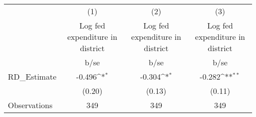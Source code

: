 {
\def\sym#1{\ifmmode^{#1}\else\(^{#1}\)\fi}
\begin{tabular}{l*{3}{c}}
\hline\hline
                    &\multicolumn{1}{c}{(1)}&\multicolumn{1}{c}{(2)}&\multicolumn{1}{c}{(3)}\\
                    &\multicolumn{1}{c}{Log fed expenditure in district }&\multicolumn{1}{c}{Log fed expenditure in district }&\multicolumn{1}{c}{Log fed expenditure in district }\\
                    &        b/se         &        b/se         &        b/se         \\
\hline
RD\_Estimate         &      -0.496\sym{*}  &      -0.304\sym{*}  &      -0.282\sym{**} \\
                    &      (0.20)         &      (0.13)         &      (0.11)         \\
\hline
Observations        &         349         &         349         &         349         \\
\hline\hline
\end{tabular}
}
